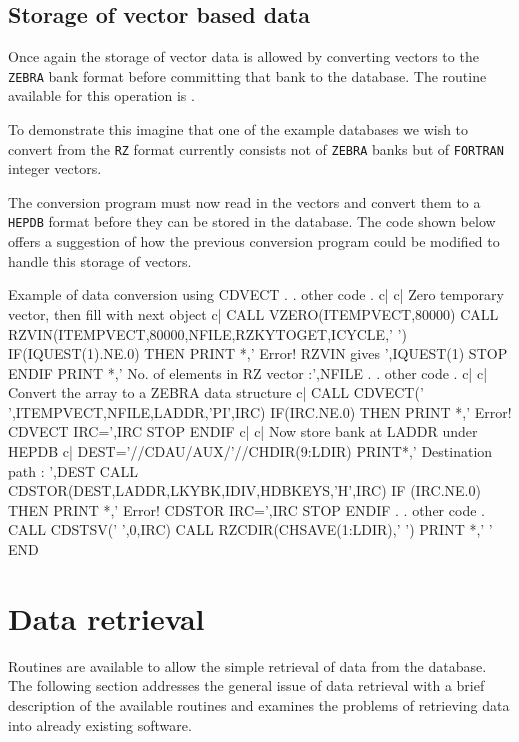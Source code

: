 \subsection{Storage of vector based data}
Once again the storage of vector data is allowed by converting vectors to
the {\tt ZEBRA} bank format before committing that bank to the database.
The routine available for this operation is .
\par
To demonstrate this imagine that one of the example databases we wish to convert
from the {\tt RZ} format  currently consists not of {\tt ZEBRA} banks
but of {\tt FORTRAN} integer vectors.
\par
The conversion program must now read in the vectors and convert them to
a {\tt HEPDB} format before they can be stored in the database.
The code shown below offers a suggestion of how the previous conversion program
could be modified to handle this storage of vectors.
%
\begin{XMPt}{Example of data conversion using CDVECT}
                  .
                  . other code
                  .
c|
c|       Zero temporary vector, then fill with next object
c|
         CALL VZERO(ITEMPVECT,80000)
         CALL RZVIN(ITEMPVECT,80000,NFILE,RZKYTOGET,ICYCLE,' ')
         IF(IQUEST(1).NE.0) THEN
              PRINT *,' Error! RZVIN gives ',IQUEST(1)
              STOP
         ENDIF
         PRINT *,' No. of elements in RZ vector :',NFILE
                  .
                  . other code
                  .
c|
c|       Convert the array to a ZEBRA data structure
c|
         CALL CDVECT(' ',ITEMPVECT,NFILE,LADDR,'PI',IRC)
         IF(IRC.NE.0) THEN
              PRINT *,' Error! CDVECT IRC=',IRC
              STOP
         ENDIF
c|
c|       Now store bank at LADDR under HEPDB
c|
         DEST='//CDAU/AUX/'//CHDIR(9:LDIR)
         PRINT*,' Destination path : ',DEST
         CALL CDSTOR(DEST,LADDR,LKYBK,IDIV,HDBKEYS,'H',IRC)
         IF (IRC.NE.0) THEN
              PRINT *,' Error! CDSTOR IRC=',IRC
              STOP
         ENDIF
                  .
                  . other code
                  .
      CALL CDSTSV(' ',0,IRC)
      CALL RZCDIR(CHSAVE(1:LDIR),' ')
      PRINT *,' '
      END
\end{XMPt}
%
%
\section{Data retrieval}
Routines are available to allow the simple retrieval of data from the database.
The following section addresses the general issue of data retrieval
with a brief description of the available routines and examines the problems
of retrieving data into already existing software.
%
